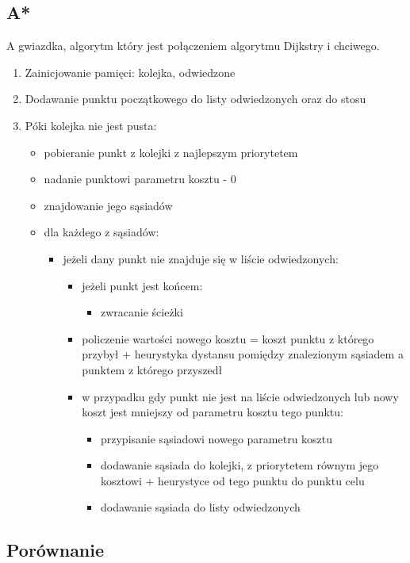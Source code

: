 \documentclass{article}
\begin{document}
\subsection{A*}
A gwiazdka, algorytm który jest połączeniem algorytmu Dijkstry i chciwego.  
\begin{enumerate}
\item Zainicjowanie pamięci: kolejka, odwiedzone
\item Dodawanie punktu początkowego do listy odwiedzonych oraz do stosu
\item Póki kolejka nie jest pusta:
	\begin{itemize}
	\item pobieranie punkt z kolejki z najlepszym priorytetem
	\item nadanie punktowi parametru kosztu - 0
	\item znajdowanie jego sąsiadów
	\item dla każdego z sąsiadów:
	\begin{itemize}
		\item jeżeli dany punkt nie znajduje się w liście odwiedzonych:
			\begin{itemize}
			\item jeżeli punkt jest końcem:
				\begin{itemize}
				\item zwracanie ścieżki
				\end{itemize}
			\item policzenie wartości nowego kosztu = koszt punktu z którego przybył + heurystyka dystansu pomiędzy znalezionym sąsiadem a punktem z którego przyszedł
			\item w przypadku gdy punkt nie jest na liście odwiedzonych lub nowy koszt jest mniejszy od parametru kosztu tego punktu:
				\begin{itemize}
				\item przypisanie sąsiadowi nowego parametru kosztu
				\item dodawanie sąsiada do kolejki, z priorytetem równym jego kosztowi + heurystyce od tego punktu do punktu celu
				\item dodawanie sąsiada do listy odwiedzonych				
				\end{itemize}
			\end{itemize}
		\end{itemize}		
	\end{itemize}
\end{enumerate}

\subsection{Porównanie}
\end{document}
